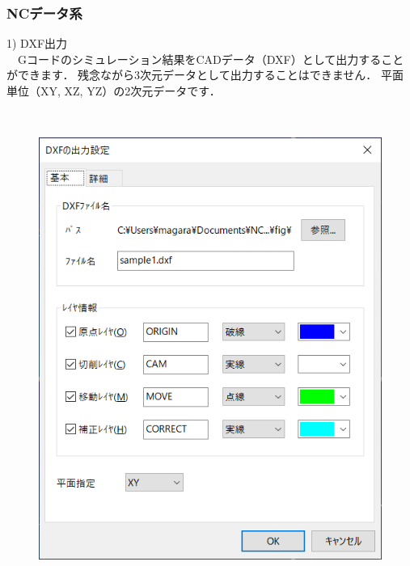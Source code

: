 \subsubsection{NCデータ系}

\begin{minipage}[t]{0.48\textwidth}
1) DXF出力\\
　Gコードのシミュレーション結果をCADデータ（DXF）として出力することができます．
残念ながら3次元データとして出力することはできません．
平面単位（XY, XZ, YZ）の2次元データです．
\end{minipage}
\begin{minipage}[t]{0.02\textwidth}
　
\end{minipage}
\begin{minipage}[t]{0.5\textwidth}
\vspace*{-2zh}
\begin{figure}[H]
\centering
\includegraphics[width=\textwidth]{No6/fig/nc-outdxf.png}
\label{fig:nc-outdxf.png}
\end{figure}
\end{minipage}

